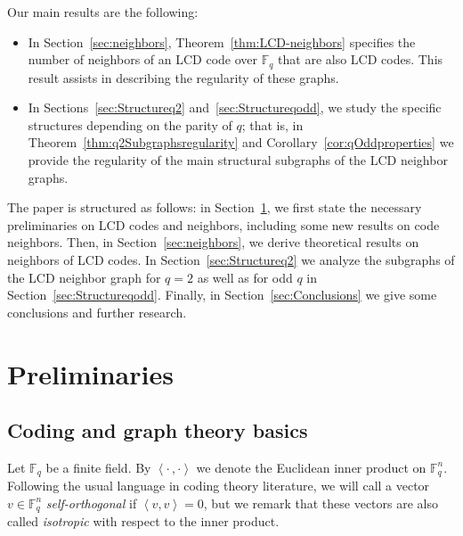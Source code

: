 \documentclass[11pt]{article}
\theoremstyle{definition}
\newcommand{\F}{\mathbb{F}}
\newcommand{\Ang}[1]{\left\langle#1\right\rangle}
\begin{document}
Our main results are the following:
\begin{itemize}
	\item In Section~\ref{sec:neighbors}, Theorem~\ref{thm:LCD-neighbors} specifies the number of neighbors of an LCD code over $\mathbb{F}_q$ that are also LCD codes.
		This result assists in describing the regularity of these graphs.
	\item In Sections~\ref{sec:Structureq2} and~\ref{sec:Structureqodd}, we study the specific structures depending on the parity of $q$; that is, in Theorem~\ref{thm:q2Subgraphsregularity} and Corollary~\ref{cor:qOddproperties} we provide the regularity of the main structural subgraphs of the LCD neighbor graphs.
\end{itemize}

The paper is structured as follows: in Section~\ref{sec:prelims}, we first state the necessary preliminaries on LCD codes and neighbors, including some new results on code neighbors.
Then, in Section~\ref{sec:neighbors}, we derive theoretical results on neighbors of LCD codes.
In Section~\ref{sec:Structureq2} we analyze the subgraphs of the LCD neighbor graph for $q = 2$ as well as for odd $q$ in Section~\ref{sec:Structureqodd}.
Finally, in Section~\ref{sec:Conclusions} we give some conclusions and further research.


\section{Preliminaries}\label{sec:prelims}


\subsection{Coding and graph theory basics}

Let $\F_q$ be a finite field.
By $\Ang{\cdot \, , \cdot}$ we denote the Euclidean inner product on $\F_q^n$.
Following the usual language in coding theory literature, we will call a vector $v\in \F_q^n$ \emph{self-orthogonal} if $\Ang{v, v} = 0$, but we remark that these vectors are also called \emph{isotropic} with respect to the inner product.
\end{document}
